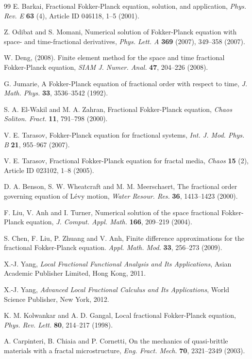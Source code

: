 \documentclass[10pt]{NSP1}
\begin{document}
\begin{thebibliography}{99}
E. Barkai, Fractional Fokker-Planck equation, solution, and application,
\textit{Phys. Rev. E} {\bf 63} (4), Article ID 046118, 1--5 (2001).

Z. Odibat and S. Momani, Numerical solution of Fokker-Planck equation with space- and
time-fractional derivatives, \textit{Phys. Lett. A} {\bf 369} (2007), 349--358 (2007).

W. Deng,  (2008). Finite element method for the space
and time fractional Fokker-Planck equation,
{\it SIAM J. Numer. Anal.} {\bf 47}, 204--226 (2008).

G. Jumarie,  A Fokker-Planck equation of fractional order with respect to time,
{\it J. Math. Phys.} {\bf 33}, 3536--3542 (1992).

S. A. El-Wakil and M. A. Zahran, Fractional Fokker-Planck equation, {\it Chaos
Soliton. Fract.} {\bf 11}, 791--798 (2000).

V. E. Tarasov, Fokker-Planck equation for fractional systems,
{\it Int. J. Mod. Phys. B} {\bf 21}, 955--967 (2007).

V. E. Tarasov, Fractional Fokker-Planck equation for fractal media,
{\it Chaos} {\bf 15} (2), Article ID 023102, 1--8 (2005).

D. A. Benson, S. W. Wheatcraft and M. M. Meerschaert, The fractional order
governing equation of L\'{e}vy motion, {\it Water Resour. Res.}
{\bf 36}, 1413--1423 (2000).

F. Liu, V. Anh and I. Turner, Numerical solution of
the space fractional Fokker-Planck equation,
{\it J. Comput. Appl. Math.} {\bf 166}, 209--219 (2004).

S. Chen, F. Liu, P. Zhuang and V. Anh, Finite difference approximations for the
fractional Fokker-Planck equation. {\it Appl. Math. Mod.} {\bf 33}, 256--273 (2009).

X.-J. Yang, {\it Local Fractional Functional Analysis and Its Applications},
Asian Academic Publisher Limited, Hong Kong, 2011.

X.-J. Yang, {\it Advanced Local Fractional Calculus and Its Applications},
World Science Publisher, New York, 2012.

K. M. Kolwankar and A. D. Gangal, Local fractional Fokker-Planck equation,
{\it Phys. Rev. Lett.} {\bf 80}, 214--217 (1998).

A. Carpinteri, B. Chiaia and P. Cornetti, On the mechanics of quasi-brittle materials
with a fractal microstructure, {\it Eng. Fract. Mech.} {\bf 70}, 2321--2349 (2003).


\end{thebibliography}
\end{document}
